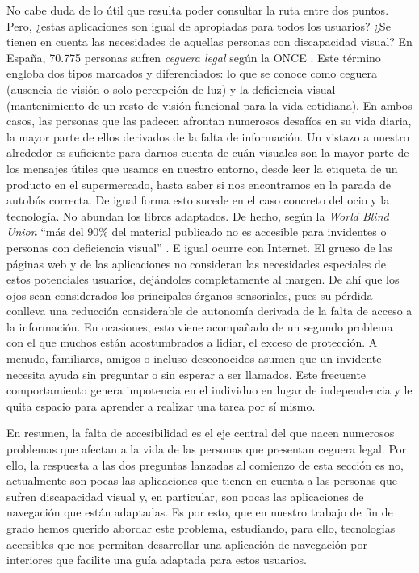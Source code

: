 No cabe duda de lo útil que resulta poder consultar la ruta entre dos puntos. Pero, ¿estas aplicaciones son igual de apropiadas para todos los usuarios? ¿Se tienen en cuenta las necesidades de aquellas personas con discapacidad visual? En España, 70.775 personas sufren \textit{ceguera legal} según la ONCE \citep{informeceguera}. Este término engloba dos tipos marcados y diferenciados: lo que se conoce como ceguera (ausencia de visión o solo percepción de luz) y la deficiencia visual (mantenimiento de un resto de visión funcional para la vida cotidiana). En ambos casos, las personas que las padecen afrontan numerosos desafíos en su vida diaria, la mayor parte de ellos derivados de la falta de información. Un vistazo a nuestro alrededor es suficiente para darnos cuenta de cuán visuales son la mayor parte de los mensajes útiles que usamos en nuestro entorno, desde leer la etiqueta de un producto en el supermercado, hasta saber si nos encontramos en la parada de autobús correcta. De igual forma esto sucede en el caso concreto del ocio y la tecnología. No abundan los libros adaptados. De hecho, según la \textit{World Blind Union} ``más del $90\%$ del material publicado no es accesible para invidentes o personas con deficiencia visual'' \citep{envision}. E igual ocurre con Internet. El grueso de las páginas web y de las aplicaciones no consideran las necesidades especiales de estos potenciales usuarios, dejándoles completamente al margen. De ahí que los ojos sean considerados los principales órganos sensoriales, pues su pérdida conlleva una reducción considerable de autonomía derivada de la falta de acceso a la información. En ocasiones, esto viene acompañado de un segundo problema con el que muchos están acostumbrados a lidiar, el exceso de protección. A menudo, familiares, amigos o incluso desconocidos asumen que un invidente necesita ayuda sin preguntar o sin esperar a ser llamados. Este frecuente comportamiento genera impotencia en el individuo en lugar de independencia y le quita espacio para aprender a realizar una tarea por sí mismo. 

En resumen, la falta de accesibilidad es el eje central del que nacen numerosos problemas que afectan a la vida de las personas que presentan ceguera legal. Por ello, la respuesta a las dos preguntas lanzadas al comienzo de esta sección es no, actualmente son pocas las aplicaciones que tienen en cuenta a las personas que sufren discapacidad visual y, en particular, son pocas las aplicaciones de navegación que están adaptadas. Es por esto, que en nuestro trabajo de fin de grado hemos querido abordar este problema, estudiando, para ello, tecnologías accesibles que nos permitan desarrollar una aplicación de navegación por interiores que facilite una guía adaptada para estos usuarios.

